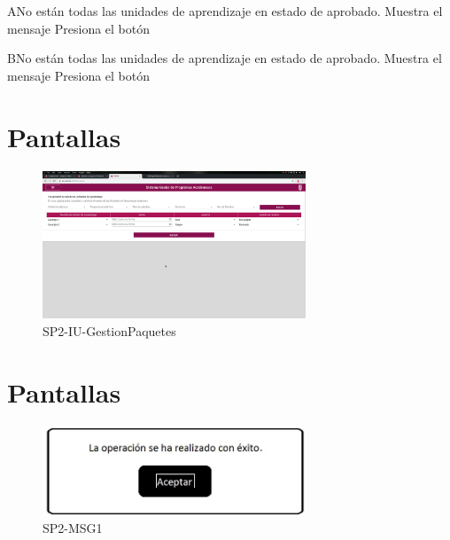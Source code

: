 \label{SP2-CU5-A}
\begin{UCtrayectoriaA}{A}{No están todas las unidades de aprendizaje en estado de aprobado.}
    \UCpaso Muestra el mensaje 
    \UCpaso[\UCactor] Presiona el botón 
\end{UCtrayectoriaA}


\label{SP2-CU5-B}
\begin{UCtrayectoriaA}{B}{No están todas las unidades de aprendizaje en estado de aprobado.}
    \UCpaso Muestra el mensaje 
    \UCpaso[\UCactor] Presiona el botón 
\end{UCtrayectoriaA}


\chapter{Pantallas}
 \begin{figure}
  \centering
    \includegraphics[width=0.7\textwidth]{DCU/SP2/Pantallas/GestionPaquetes}
  \caption{SP2-IU-GestionPaquetes}
  \label{SP2-IU-GestionPaquetes}
\end{figure}

\chapter{Pantallas}
 \begin{figure}
  \centering
    \includegraphics[width=0.7\textwidth]{DCU/SP2/mensajes/MSG1}
   \caption{SP2-MSG1}
  \label{SP2-MSG1}
\end{figure}

